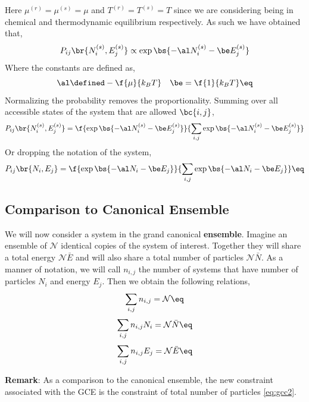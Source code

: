 \documentclass{article}
\begin{document}
{Here $\mu^{(r)} = \mu^{(s)} = \mu$ and $T^{(r)} = T^{(s)} = T$ since we are considering being in chemical and thermodynamic equilibrium respectively. As such we have obtained that,
\[ P_{ij}\br{N^{(s)}_i,E^{(s)}_j} \propto \exp\bs{-\al N^{(s)}_i - \be E^{(s)}_j} \]
Where the constants are defined as,
\[ \al \defined -\f{\mu}{k_B T}  \quad \be = \f{1}{k_B T} \eq \label{eq:albe}\]
Normalizing the probability removes the proportionality. Summing over all accessible states of the system that are allowed $\bc{i,j}$,
\[ P_{ij}\br{N^{(s)}_i,E^{(s)}_j} =  \f{\exp\bs{-\al N^{(s)}_i - \be E^{(s)}_j}}{\sum_{i,j}\exp\bs{-\al N^{(s)}_i - \be E^{(s)}_j}} \]
Or dropping the notation of the system,
\[ P_{ij}\br{N_i,E_j} =  \f{\exp\bs{-\al N_i - \be E_j}}{\sum_{i,j}\exp\bs{-\al N_i - \be E_j}} \eq \label{eq:PGCE}\]

\subsection{Comparison to Canonical Ensemble}
We will now consider a system in the grand canonical \textbf{ensemble}. Imagine an ensemble of $\mathcal{N}$ identical copies of the system of interest. Together they will share a total energy $\mathcal{N} \bar{E}$ and will also share a total number of particles $\mathcal{N} \bar{N}$. As a manner of notation, we will call $n_{i,j}$ the number of systems that have number of particles $N_{i}$ and energy $E_{j}$. Then we obtain the following relations,
\[ \sum_{i,j} n_{i,j} = \mathcal{N} \eq \label{eq:gcc1} \]
\[ \sum_{i,j} n_{i,j}N_i = \mathcal{N} \bar{N} \eq \label{eq:gcc2}\]
\[ \sum_{i,j} n_{i,j}E_j = \mathcal{N} \bar{E} \eq \label{eq:gcc3} \]

\textbf{Remark}: As a comparison to the canonical ensemble, the new constraint associated with the GCE is the constraint of total number of particles \eqref{eq:gcc2}. \\

}
\end{document}
